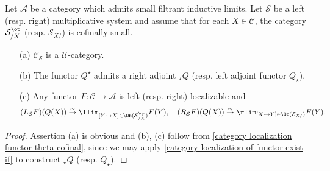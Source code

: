 \begin{corollary}
Let $\mathcal{A}$ be a category which admits small filtrant inductive limits. Let $\mathcal{S}$ be a left (resp. right) multiplicative system and assume that for each $X\in\mathcal{C}$, the category $\mathcal{S}_{/X}^{\op}$ (resp. $\mathcal{S}_{X/}$) is cofinally small.
\begin{enumerate}
    \item[(a)] $\mathcal{C}_\mathcal{S}$ is a $\mathscr{U}$-category.
    \item[(b)] The functor $Q^\star$ admits a right adjoint $_\star Q$ (resp. left adjoint functor $Q_\star$).
    \item[(c)] Any functor $F:\mathcal{C}\to\mathcal{A}$ is left (resp. right) localizable and
    \begin{gather*}
    (L_\mathcal{S}F)(Q(X)) \stackrel{\sim}{\to} \llim_{[Y\rightarrowtail X]\in\Ob(\mathcal{S}_{/X}^{\op})}F(Y),\quad (R_\mathcal{S}F)(Q(X)) \stackrel{\sim}{\to} \rlim_{[X\rightarrowtail Y]\in\Ob(\mathcal{S}_{X/})}F(Y).
    \end{gather*}
\end{enumerate}
\end{corollary}
\begin{proof}
Assertion (a) is obvious and (b), (c) follow from \cref{category localization functor theta cofinal}, since we may apply \cref{category localization of functor exist if} to construct $_\star Q$ (resp. $Q_\star$).
\end{proof}

